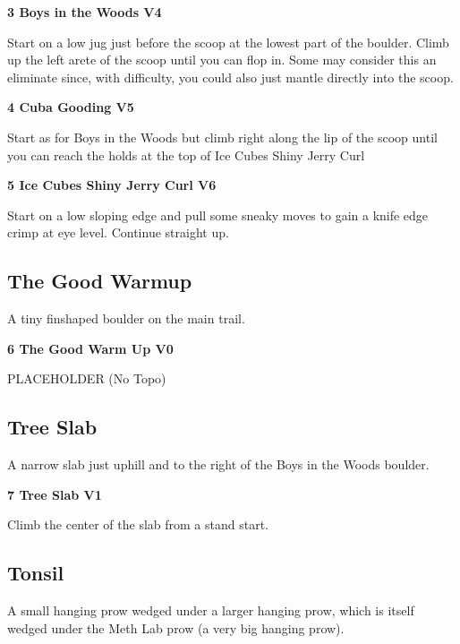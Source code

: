 \begin{multicols}{2}

					\label{rt:Boys in the Woods} \colorbox{RoyalBlue!20}{\textbf{3 Boys in the Woods V4 \ding{72}   }}
					\begin{adjustwidth}{1cm}{}
					Start on a low jug just before the scoop at the lowest part of the boulder. Climb up the left arete of the scoop until you can flop in. Some may consider this an eliminate since, with difficulty, you could also just mantle directly into the scoop.
					\end{adjustwidth}
					\label{rt:Cuba Gooding} \colorbox{RoyalBlue!20}{\textbf{4 Cuba Gooding V5  }}
					\begin{adjustwidth}{1cm}{}
					Start as for Boys in the Woods but climb right along the lip of the scoop until you can reach the holds at the top of Ice Cubes Shiny Jerry Curl
					\end{adjustwidth}
					\label{rt:Ice Cubes Shiny Jerry Curl} \colorbox{RoyalBlue!20}{\textbf{5 Ice Cubes Shiny Jerry Curl V6  }}
					\begin{adjustwidth}{1cm}{}
					Start on a low sloping edge and pull some sneaky moves to gain a knife edge crimp at eye level. Continue straight up.
					\end{adjustwidth}
			\subsection*{The Good Warmup}\label{bf:The Good Warmup}
			A tiny finshaped boulder on the main trail.
			
					\label{rt:The Good Warm Up} \colorbox{green!20}{\textbf{6 The Good Warm Up V0  }}
					\begin{adjustwidth}{1cm}{}
					PLACEHOLDER
						\newline (No Topo) 
					\end{adjustwidth}
			\subsection*{Tree Slab}\label{bf:Tree Slab}
			A narrow slab just uphill and to the right of the Boys in the Woods boulder.
			
					\label{rt:Tree Slab} \colorbox{green!20}{\textbf{7 Tree Slab V1    }}
					\begin{adjustwidth}{1cm}{}
					Climb the center of the slab from a stand start.
					\end{adjustwidth}
			\subsection*{Tonsil}\label{bf:Tonsil}
			A small hanging prow wedged under a larger hanging prow, which is itself wedged under the Meth Lab prow (a very big hanging prow).
			

\end{multicols}

